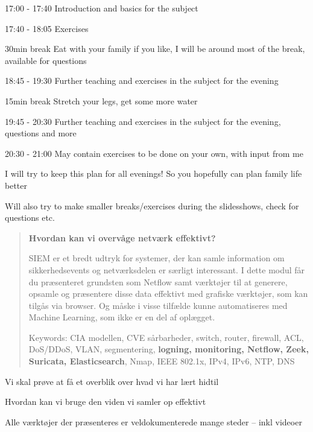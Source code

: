 \documentclass[Screen16to9,17pt]{foils}
\begin{document}
\begin{list2}
\item 17:00 - 17:40 Introduction and basics for the subject

\item 17:40 - 18:05 Exercises

\item 30min break Eat with your family if you like, I will be around most of the break, available for questions

\item 18:45 - 19:30 Further teaching and exercises in the subject for the evening

\item 15min break Stretch your legs, get some more water

\item 19:45 - 20:30
Further teaching and exercises in the subject for the evening, questions and more

\item 20:30 - 21:00 May contain exercises to be done on your own, with input from me
\end{list2}

\centerline{I will try to keep this plan for all evenings! So you hopefully can plan family life better}

Will also try to make smaller breaks/exercises during the slidesshows, check for questions etc.





\begin{quote}
{\bf Hvordan kan vi overvåge netværk effektivt?}

SIEM er et bredt udtryk for systemer, der kan samle information om sikkerhedsevents og netværksdelen er særligt interessant. I dette modul får du præsenteret grundsten som Netflow samt værktøjer til at generere, opsamle og præsentere disse data effektivt med grafiske værktøjer, som kan tilgås via browser. Og måske i visse tilfælde kunne automatiseres med Machine Learning, som ikke er en del af oplægget.


\vskip 5mm
Keywords: CIA modellen, CVE sårbarheder, switch, router, firewall, ACL, DoS/DDoS, VLAN, segmentering, {\bf logning, monitoring, Netflow, Zeek, Suricata, \bf Elasticsearch}, Nmap, IEEE 802.1x, IPv4, IPv6, NTP, DNS
\end{quote}

\begin{list2}
\item Vi skal prøve at få et overblik over hvad vi har lært hidtil
\item Hvordan kan vi bruge den viden vi samler op effektivt
\item Alle værktøjer der præsenteres er veldokumenterede mange steder -- inkl videoer
\end{list2}
\end{document}
